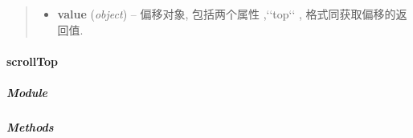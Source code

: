 \documentclass[letterpaper,10pt,english]{sphinxmanual}
\begin{document}
\begin{fulllineitems}
\begin{quote}
\begin{description}
\begin{itemize}
\item {}
\textbf{value} (\emph{object}) -- 偏移对象, 包括两个属性  ,{}`{}`top{}`{}` , 格式同获取偏移的返回值.

\end{itemize}

\end{description}\end{quote}

\end{fulllineitems}



\paragraph{scrollTop}
\label{api/core/dom/scrollTop:scrolltop}\label{api/core/dom/scrollTop::doc}

\subparagraph{Module}
\label{api/core/dom/scrollTop:module}\begin{quote}

{\hyperref[api/core/dom/index:module-DOM]{}}
\end{quote}


\subparagraph{Methods}
\label{api/core/dom/scrollTop:methods}
\end{document}
